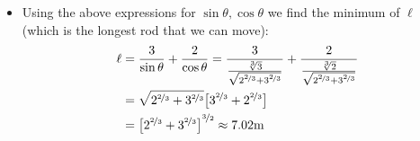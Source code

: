 \begin{eg}
\begin{itemize}
\item Using the above expressions for $\sin\theta, \cos\theta$ we find the minimum of
$\ell$ (which is the longest rod that we can move):
\begin{align*}
  \ell &= \frac{3}{\sin\theta} + \frac{2}{\cos\theta}
=\frac{3}{ \frac{\root 3\of 3}
         {\sqrt{2^{\nicefrac{2}{3}}+3^{\nicefrac{2}{3}}}} }
+\frac{2}{ \frac{\root 3\of 2}{\sqrt{2^{\nicefrac{2}{3}}+3^{\nicefrac{2}{3}}}} }\\
& =\sqrt{2^{\nicefrac{2}{3}}+3^{\nicefrac{2}{3}}}
                 \big[3^{\nicefrac{2}{3}}+2^{\nicefrac{2}{3}}\big] \\
& ={\big[2^{\nicefrac{2}{3}}+3^{\nicefrac{2}{3}}\big]}^{\nicefrac{3}{2}}
\approx 7.02\text{m}
\end{align*}

\end{itemize}

\end{eg}
\goodbreak

